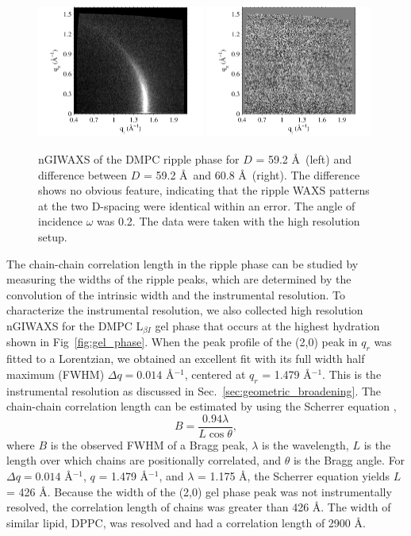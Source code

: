 \begin{figure}[htbp]
  \centering
  \includegraphics[width=0.49\textwidth]{figures/ripple/nGIWAXS/dmpc1_046}
  \includegraphics[width=0.49\textwidth]{figures/ripple/nGIWAXS/046_vs_052}
  \caption{nGIWAXS of the DMPC ripple phase for $D$ = 59.2 \AA\ (left)
  and difference between $D$ = 59.2 \AA\ and 60.8 \AA\ (right). 
  The difference shows no obvious feature, indicating that the ripple WAXS
  patterns at the two D-spacing were identical within an error.
  The angle of incidence $\omega$ was 0.2\textdegree. The data were taken
  with the high resolution setup.}
  \label{fig:nGIWAXS}
\end{figure}

The chain-chain correlation length in the ripple phase can be studied by
measuring the widths of the ripple peaks, which are determined by the convolution of 
the intrinsic width and the instrumental resolution. To characterize the instrumental 
resolution, we also collected high resolution nGIWAXS for the DMPC L$_{\beta I}$ gel phase
that occurs at the highest hydration \cite{ref:Smith88,Tristram-Nagle02}
shown in Fig~\ref{fig:gel_phase}.
When the peak profile of the (2,0) peak in $q_r$ was fitted to a Lorentzian, 
we obtained
an excellent fit with its full width half maximum (FWHM) $\Delta q = 0.014$ \AA$^{-1}$,
centered at $q_r$ = 1.479 \AA$^{-1}$.
This is the instrumental resolution as discussed in Sec.~\ref{sec:geometric_broadening}. 
The chain-chain correlation length can be estimated by using the Scherrer equation 
\cite{ref:Warren69},
\[
  B = \frac{0.94\lambda}{L\cos\theta},
\]
where $B$ is the observed FWHM of a Bragg peak, $\lambda$ is the wavelength,
$L$ is the length over which chains are positionally correlated, 
and $\theta$ is the Bragg angle. For $\Delta q = 0.014$ \AA$^{-1}$,
$q$ = 1.479 \AA$^{-1}$, and $\lambda$ = 1.175 \AA, the 
Scherrer equation yields $L$ = 426 \AA. 
Because the width of the (2,0) gel phase peak 
was not instrumentally resolved, the correlation length of chains was 
greater than 426 \AA.
The width of similar lipid, DPPC, was resolved and had a correlation 
length of 2900 \AA \cite{ref:Sun94}.

